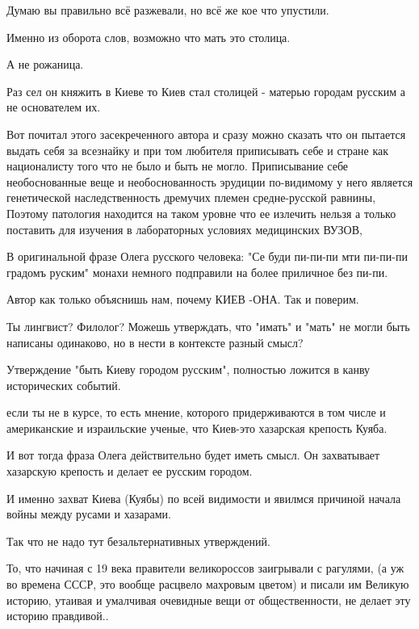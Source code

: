 \begin{itemize}

Думаю вы правильно всё разжевали, но всё же кое что упустили.

Именно из оборота слов, возможно что мать это столица.

А не рожаница.

Раз сел он княжить в Киеве то Киев стал столицей - матерью городам русским а не
основателем их.


Вот почитал этого засекреченного автора и сразу можно сказать что он пытается
выдать себя за всезнайку и при том любителя приписывать себе и стране как
националисту того что не было и быть не могло. Приписывание себе необоснованные
веще и необоснованность эрудиции по-видимому у него является генетической
наследственность дремучих племен средне-русской равнины, Поэтому патология
находится на таком уровне что ее излечить нельзя а только поставить для
изучения в лабораторных условиях медицинских ВУЗОВ,


В оригинальной фразе Олега русского человека: "Се буди пи-пи-пи мти пи-пи-пи
градомъ руским" монахи немного подправили на более приличное без пи-пи.


Автор как только объяснишь нам, почему КИЕВ -ОНА. Так и поверим.

Ты лингвист? Филолог? Можешь утверждать, что "имать" и "мать" не могли быть
написаны одинаково, но в нести в контексте разный смысл?

Утверждение "быть Киеву городом русским", полностью ложится в канву
исторических событий.

если ты не в курсе, то есть мнение, которого придерживаются в том числе и
американские и израильские ученые, что Киев-это хазарская крепость Куяба.

И вот тогда фраза Олега действительно будет иметь смысл. Он захватывает
хазарскую крепость и делает ее русским городом.

И именно захват Киева (Куябы) по всей видимости и явилмся причиной начала войны
между русами и хазарами.

Так что не надо тут безальтернативных утверждений.

То, что начиная с 19 века правители великороссов заигрывали с рагулями, (а уж
во времена СССР, это вообще расцвело махровым цветом) и писали им Великую
историю, утаивая и умалчивая очевидные вещи от общественности, не делает эту
историю правдивой..


\end{itemize}

